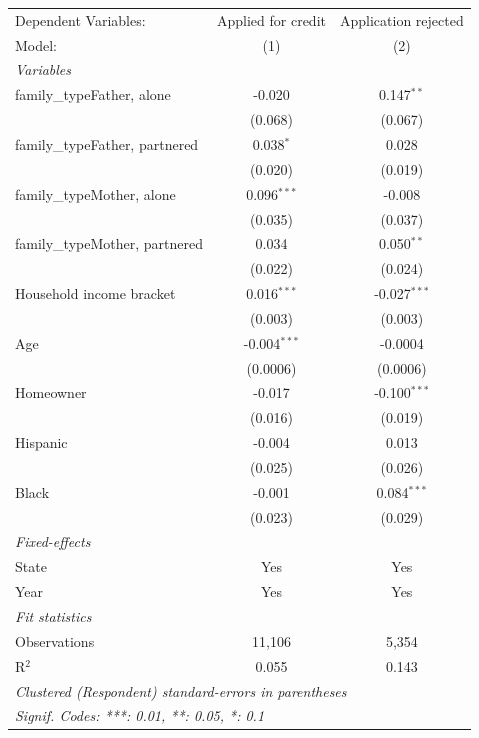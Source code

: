 
\begingroup
\centering
\begin{tabular}{lcc}
   \tabularnewline \midrule \midrule
   Dependent Variables:           & Applied for credit & Application rejected\\  
   Model:                         & (1)                & (2)\\  
   \midrule
   \emph{Variables}\\
   family\_typeFather, alone      & -0.020             & 0.147$^{**}$\\   
                                  & (0.068)            & (0.067)\\   
   family\_typeFather, partnered  & 0.038$^{*}$        & 0.028\\   
                                  & (0.020)            & (0.019)\\   
   family\_typeMother, alone      & 0.096$^{***}$      & -0.008\\   
                                  & (0.035)            & (0.037)\\   
   family\_typeMother, partnered  & 0.034              & 0.050$^{**}$\\   
                                  & (0.022)            & (0.024)\\   
   Household income bracket       & 0.016$^{***}$      & -0.027$^{***}$\\   
                                  & (0.003)            & (0.003)\\   
   Age                            & -0.004$^{***}$     & -0.0004\\   
                                  & (0.0006)           & (0.0006)\\   
   Homeowner                      & -0.017             & -0.100$^{***}$\\   
                                  & (0.016)            & (0.019)\\   
   Hispanic                       & -0.004             & 0.013\\   
                                  & (0.025)            & (0.026)\\   
   Black                          & -0.001             & 0.084$^{***}$\\   
                                  & (0.023)            & (0.029)\\   
   \midrule
   \emph{Fixed-effects}\\
   State                          & Yes                & Yes\\  
   Year                           & Yes                & Yes\\  
   \midrule
   \emph{Fit statistics}\\
   Observations                   & 11,106             & 5,354\\  
   R$^2$                          & 0.055              & 0.143\\  
   \midrule \midrule
   \multicolumn{3}{l}{\emph{Clustered (Respondent) standard-errors in parentheses}}\\
   \multicolumn{3}{l}{\emph{Signif. Codes: ***: 0.01, **: 0.05, *: 0.1}}\\
\end{tabular}
\par\endgroup


